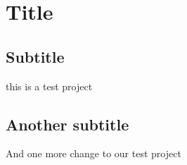 \documentclass{article}
\begin{document}
\section{Title}

\subsection{Subtitle}

this is a test project

\subsection{Another subtitle}

And one more change to our test project
\end{document}
